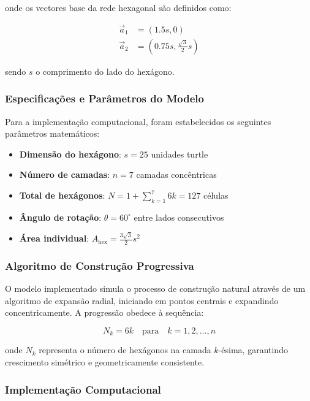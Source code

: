 \documentclass[12pt,a4paper,oneside]{extarticle}
\begin{document}
onde os vectores base da rede hexagonal são definidos como:

\begin{align}
\vec{a}_1 &= \left(1.5s, 0\right) \\
\vec{a}_2 &= \left(0.75s, \frac{\sqrt{3}}{2}s\right)
\label{eq:base_vectors}
\end{align}

sendo $s$ o comprimento do lado do hexágono.

\subsubsection{Especificações e Parâmetros do Modelo}
Para a implementação computacional, foram estabelecidos os seguintes parâmetros matemáticos:

\begin{itemize}
    \item \textbf{Dimensão do hexágono}: $s = 25$ unidades turtle
    \item \textbf{Número de camadas}: $n = 7$ camadas concêntricas
    \item \textbf{Total de hexágonos}: $N = 1 + \sum_{k=1}^{7} 6k = 127$ células
    \item \textbf{Ângulo de rotação}: $\theta = 60^\circ$ entre lados consecutivos
    \item \textbf{Área individual}: $A_{\text{hex}} = \frac{3\sqrt{3}}{2}s^2$
\end{itemize}


\subsubsection{Algoritmo de Construção Progressiva}
O modelo implementado simula o processo de construção natural através de um algoritmo de expansão radial, iniciando em pontos centrais e expandindo concentricamente. A progressão obedece à sequência:

\begin{equation}
N_k = 6k \quad \text{para} \quad k = 1, 2, \ldots, n
\label{eq:progressive_growth}
\end{equation}

onde $N_k$ representa o número de hexágonos na camada $k$-ésima, garantindo crescimento simétrico e geometricamente consistente.


\subsubsection{Implementação Computacional}
\end{document}
